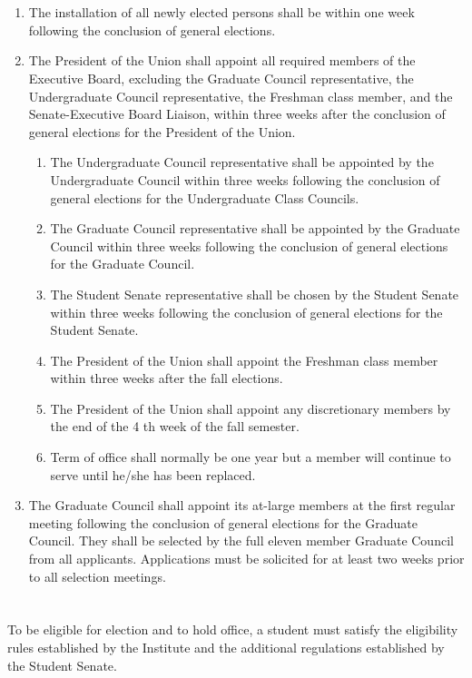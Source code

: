 \documentclass[12pt]{constitution}
\begin{document}
\section{}
\begin{enumerate}
\item The installation of all newly elected persons shall be within one week following the conclusion of
general elections.
\item The President of the Union shall appoint all required members of the Executive Board, excluding
the Graduate Council representative, the Undergraduate Council representative, the Freshman
class member, and the Senate-Executive Board Liaison, within three weeks after the conclusion
of general elections for the President of the Union.
\begin{enumerate}
\item The Undergraduate Council representative shall be appointed by the Undergraduate
Council within three weeks following the conclusion of general elections for the
Undergraduate Class Councils.
\item The Graduate Council representative shall be appointed by the Graduate Council within
three weeks following the conclusion of general elections for the Graduate Council.
\item The Student Senate representative shall be chosen by the Student Senate within three
weeks following the conclusion of general elections for the Student Senate.
\item The President of the Union shall appoint the Freshman class member within three
weeks after the fall elections.
\item The President of the Union shall appoint any discretionary members by the end of the
4
th week of the fall semester.
\item Term of office shall normally be one year but a member will continue to serve until
he/she has been replaced.
\end{enumerate}
\item The Graduate Council shall appoint its at-large members at the first regular meeting following
the conclusion of general elections for the Graduate Council. They shall be selected by the full
eleven member Graduate Council from all applicants. Applications must be solicited for at least
two weeks prior to all selection meetings.
\end{enumerate}

\section{}
To be eligible for election and to hold office, a student must satisfy the eligibility rules established by the
Institute and the additional regulations established by the Student Senate.
\end{document}
